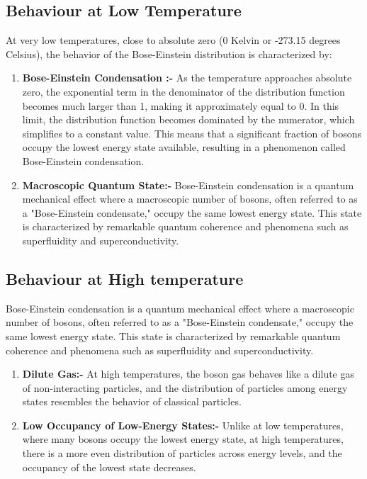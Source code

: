 \documentclass{article}
\begin{document}
\subsection*{Behaviour at Low Temperature}
At very low temperatures, close to absolute zero (0 Kelvin or -273.15 degrees
Celsius), the behavior of the Bose-Einstein distribution is characterized by:
\begin{enumerate}
    \item \textbf{Bose-Einstein Condensation :-} As the temperature approaches absolute zero, the exponential term in the denominator of the distribution function becomes much larger than 1, making it approximately equal to 0. In this limit, the distribution function becomes dominated by the numerator, which simplifies to a constant value. This means that a significant fraction of bosons occupy the lowest energy state available, resulting in a phenomenon called Bose-Einstein condensation.
    \item \textbf{Macroscopic Quantum State:-} Bose-Einstein condensation is a quantum mechanical effect where a macroscopic number of bosons, often referred to as a "Bose-Einstein condensate," occupy the same lowest energy state. This state is characterized by remarkable quantum coherence and phenomena such as superfluidity and superconductivity.
\end{enumerate}

\subsection*{Behaviour at High temperature}
Bose-Einstein condensation is a quantum mechanical effect where a macroscopic
number of bosons, often referred to as a "Bose-Einstein condensate," occupy the
same lowest energy state. This state is characterized by remarkable quantum
coherence and phenomena such as superfluidity and superconductivity.

\begin{enumerate}
    \item \textbf{Dilute Gas:-} At high temperatures, the boson gas behaves like a dilute gas of non-interacting particles, and the distribution of particles among energy states resembles the behavior of classical particles.
    \item \textbf{Low Occupancy of Low-Energy States:-} Unlike at low temperatures, where many bosons occupy the lowest energy state, at high temperatures, there is a more even distribution of particles across energy levels, and the occupancy of the lowest state decreases.
\end{enumerate}
\end{document}
